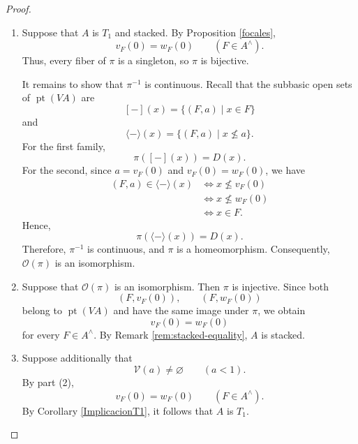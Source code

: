 \documentclass[11pt]{amsart}
\DeclareMathOperator{\pt}{pt}
\theoremstyle{plain}
\theoremstyle{definition}
\begin{document}
\begin{proof}
\mbox{ }
\begin{enumerate}
\item  Suppose that $A$ is $T_1$ and stacked.
By Proposition \ref{focales},
\[
v_F(0)=w_F(0)
\qquad(F\in A^\wedge).
\]
Thus, every fiber of $\pi$ is a singleton,
so $\pi$ is bijective.

It remains to show that $\pi^{-1}$ is
continuous. Recall that the subbasic open
sets of $\pt(VA)$ are
\[
[-](x)=\{(F,a)\mid x\in F\}
\]
and
\[
\langle-\rangle(x)
=\{(F,a)\mid x\nleq a\}.
\]
For the first family,
\[
\pi([-](x))=D(x).
\]
For the second, since $a=v_F(0)$ and
$v_F(0)=w_F(0)$, we have
\[
\begin{aligned}
(F,a)\in\langle-\rangle(x)
&\iff x\nleq v_F(0)\\
&\iff x\nleq w_F(0)\\
&\iff x\in F.
\end{aligned}
\]
Hence,
\[
\pi(\langle-\rangle(x))=D(x).
\]
Therefore, $\pi^{-1}$ is continuous,
and $\pi$ is a homeomorphism. Consequently,
$\mathcal O(\pi)$ is an isomorphism.

\item Suppose that $\mathcal O(\pi)$ is an
isomorphism. Then $\pi$ is injective.
Since both
\[
(F,v_F(0)),\qquad(F,w_F(0))
\]
belong to $\pt(VA)$ and have the same
image under $\pi$, we obtain
\[
v_F(0)=w_F(0)
\]
for every $F\in A^\wedge$. By Remark \ref{rem:stacked-equality}, $A$ is stacked.

\item Suppose additionally that
\[
\mathcal V(a)\neq\varnothing
\qquad(a<1).
\]
By part (2),
\[
v_F(0)=w_F(0)
\qquad(F\in A^\wedge).
\]
By Corollary \ref{ImplicacionT1}, it follows
that $A$ is $T_1$.
\end{enumerate}
\end{proof}
\end{document}
